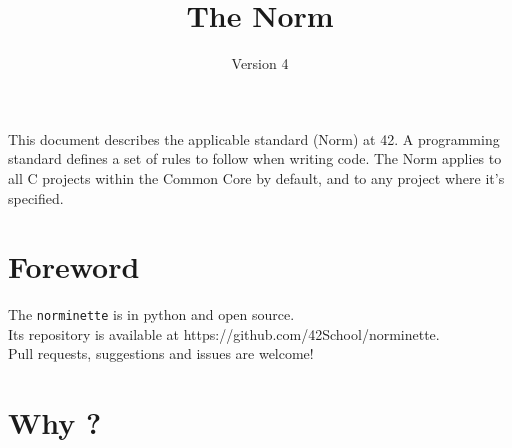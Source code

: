 \documentclass{42-en}
\begin{document}
\title{The Norm}
\subtitle{Version 4}

\summary
{
    This document describes the applicable standard (Norm) at 42. A
    programming standard defines a set of rules to follow when writing code.
    The Norm applies to all C projects within the Common Core by default, and
    to any project where it's specified.
}

\maketitle

\tableofcontents



\chapter{Foreword}

    The \texttt{norminette} is in python and open source. \\
    Its repository is available at https://github.com/42School/norminette.\\
    Pull requests, suggestions and issues are welcome!

   \newpage


%
%
    \chapter{Why ?}
\end{document}
